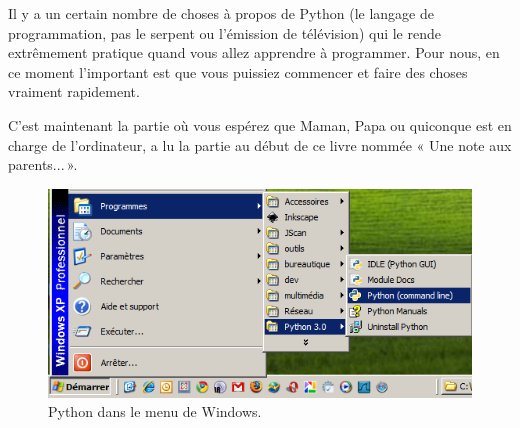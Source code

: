 Il y a un certain nombre de choses à propos de Python (le langage de programmation, pas le serpent ou l'émission de télévision) qui le rende extrêmement pratique quand vous allez apprendre à programmer. Pour nous, en ce moment l'important est que vous puissiez commencer et faire des choses vraiment rapidement.

C'est maintenant la partie où vous espérez que Maman, Papa ou quiconque est en charge de l'ordinateur, a lu la partie au début de ce livre nommée « Une note aux parents... ».

\begin{WINDOWS}
\begin{figure}[!ht]
\capstart
\centering
\includegraphics[scale=0.6]{images/startmenu}
\caption{Python dans le menu de Windows.}\label{fig:startmenu}
\end{figure}
\end{WINDOWS}

